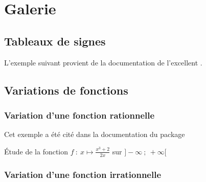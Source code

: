 \section{Galerie}
\subsection{Tableaux de signes}
L'exemple suivant provient de la documentation de l'excellent .


\medskip


\begin{tkzexample}
\end{tkzexample}


\subsection{Variations de fonctions}
 \subsubsection{Variation d'une fonction rationnelle}

 Cet exemple a été cité dans la documentation du package 

 Étude de la fonction $f~:~ x \longmapsto \frac{x^3+2}{2x}$ sur $]-\infty~;~+\infty[$

\begin{tkzexample}
\end{tkzexample}


\subsubsection{Variation d'une fonction irrationnelle}

